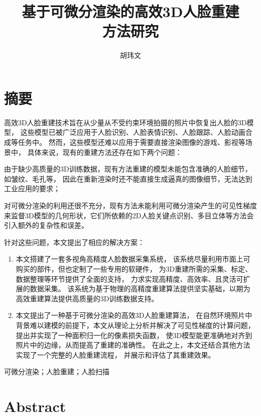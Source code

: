 \documentclass{scutmaster}
\title{基于可微分渲染的高效3D人脸重建\\方法研究}
\author{胡玮文}
\begin{document}
\maketitle
\hideinblind{
    \maketitleEN
    \nominationpage
    \declareoforiginality
}

\frontmatter
\chapter{摘要}

高效3D人脸重建技术旨在从少量从不受约束环境拍摄的照片中恢复出人脸的3D模型，
这些模型已被广泛应用于人脸识别、人脸表情识别、人脸跟踪、人脸动画合成等任务中。
然而，这些模型还难以应用于需要直接渲染图像的游戏、影视等场景中，
具体来说，现有的重建方法还存在如下两个问题：
\begin{enumerate*}
\item 由于缺少高质量的3D训练数据，现有方法重建的模型未能包含准确的人脸细节，
如皱纹、毛孔等，
因此在重新渲染时还不能直接生成逼真的图像细节，无法达到工业应用的要求；
\item 对可微分渲染的利用还很不充分，现有方法未能利用可微分渲染产生的可见性梯度来监督3D模型的几何形状，它们所依赖的2D人脸关键点识别、多目立体等方法会引入额外的复杂性和误差。
\end{enumerate*}

针对这些问题，本文提出了相应的解决方案：
\begin{enumerate}
\item 本文搭建了一套多视角高精度人脸数据采集系统，
该系统尽量利用市面上可购买的部件，但也定制了一些专用的软硬件，
为3D重建所需的采集、标定、数据整理等环节提供了全面的支持，
力求实现高精度、高效率、且灵活可扩展的数据采集。
该系统为基于物理的高精度重建算法提供坚实基础，以期为高效重建算法提供高质量的3D训练数据支持。
\item 本文提出了一种基于可微分渲染的高效3D人脸重建算法，
在自然环境照片中背景难以建模的前提下，本文从理论上分析并解决了可见性梯度的计算问题，
提出并实现了一种面积归一化的像素损失函数，
使3D模型能更准确地对齐到照片中的边缘，从而提高了重建的准确性。
在此之上，本文还结合其他方法实现了一个完整的人脸重建流程，
并展示和评估了其重建效果。
\end{enumerate}

 可微分渲染；人脸重建；人脸扫描

\chapter{Abstract}
\end{document}
